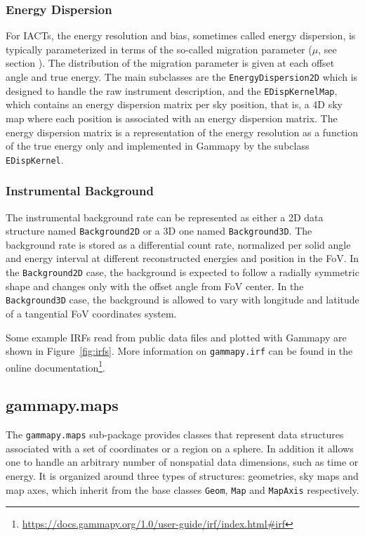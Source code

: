 \documentclass[longauth]{aa}
\newcommand{\code}[1]{\texttt{#1}}
\newcommand{\gammapy}{Gammapy\xspace}
\newcommand{\iacts}{IACTs\xspace}
\begin{document}
\subsubsection{Energy Dispersion}
For \iacts, the energy resolution and bias, sometimes called energy dispersion,
is typically parameterized in terms of the so-called
migration parameter ($\mu$, see section \label{sec:gammaray-data-analysis}).
The distribution of the migration parameter is given at each offset angle and
true energy. The main subclasses are the \code{EnergyDispersion2D} which is
designed to handle the raw instrument description, and the \code{EDispKernelMap},
which contains an energy dispersion matrix per sky position, that is, a 4D
sky map where each position is associated with an energy dispersion matrix.
The energy dispersion matrix is a representation of the energy resolution
as a function of the true energy only and implemented in \gammapy
by the subclass \code{EDispKernel}.

\subsubsection{Instrumental Background}
The instrumental background rate can be represented as either a 2D
data structure named \code{Background2D} or a 3D one named \code{Background3D}.
The background rate is stored as a differential count rate, normalized per solid angle
and energy interval at different reconstructed energies and position in the FoV.
In the \code{Background2D} case, the background is expected to follow a radially symmetric shape
and changes only with the offset angle from FoV center.
In the \code{Background3D} case, the background is allowed to vary with 
longitude and latitude of a tangential FoV coordinates system.

Some example IRFs read from public data files and plotted with \gammapy are shown 
in Figure~\ref{fig:irfs}. More information on \code{gammapy.irf} can be found 
in the online documentation\footnote{\url{https://docs.gammapy.org/1.0/user-guide/irf/index.html\#irf}}.

\subsection{gammapy.maps}
\label{ssec:gammapy-maps}
The \code{gammapy.maps} sub-package provides classes that represent data
structures associated with a set of coordinates or a region on a sphere. In
addition it allows one to handle an arbitrary number of nonspatial data
dimensions, such as time or energy. It is organized around three types of
structures: geometries, sky maps and map axes, which inherit from the base
classes \code{Geom}, \code{Map} and \code{MapAxis} respectively.
\end{document}
